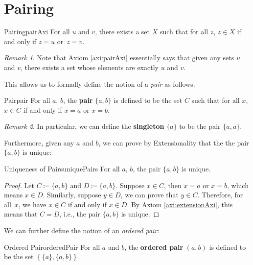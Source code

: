 \documentclass[math]{amznotes}
\theoremstyle{remark}
\newtheorem*{remark}{Remark}
\begin{document}
\section{Pairing}
\begin{axibox}{Pairing}{pairAxi}
    For all $u$ and $v$, there exists a set $X$ such that for all $z$, $z \in X$ if and only if $z = u$ or~$z = v$.
\end{axibox}
\begin{notebox}
    \begin{remark}
        Note that Axiom \ref{axi:pairAxi} essentially says that given any sets $u$ and $v$, there exists a set whose elements are exactly $u$ and $v$.
    \end{remark}
\end{notebox}
This allows us to formally define the notion of a \textit{pair} as follows:
\begin{dfnbox}{Pair}{pair}
    For all $a$, $b$, the {\color{red} \textbf{pair}} $\{a, b\}$ is defined to be the set $C$ such that for all $x$, $x \in C$ if and only if $x = a$ or $x = b$.
\end{dfnbox}
\begin{notebox}
    \begin{remark}
        In particular, we can define the {\color{red} \textbf{singleton}} $\{a\}$ to be the pair $\{a, a\}$.
    \end{remark}
\end{notebox}
Furthermore, given any $a$ and $b$, we can prove by Extensionality that the the pair $\{a, b\}$ is unique:
\begin{thmbox}{Uniqueness of Pairs}{uniquePairs}
    For all $a$, $b$, the pair $\{a, b\}$ is unique.
    \tcblower   
    \begin{proof}
        Let $C \coloneqq \{a, b\}$ and $D \coloneqq \{a, b\}$. Suppose $x \in C$, then $x = a$ or $x = b$, which means $x \in D$. Similarly, suppose $y \in D$, we can prove that $y \in C$. Therefore, for all~$x$, we have $x \in C$ if and only if $x \in D$. By Axiom \ref{axi:extensionAxi}, this means that $C = D$, i.e., the pair $\{a, b\}$ is unique.
    \end{proof}
\end{thmbox}
We can further define the notion of an \textit{ordered pair}:
\begin{dfnbox}{Ordered Pair}{orderedPair}
    For all $a$ and $b$, the {\color{red} \textbf{ordered pair}} $(a, b)$ is defined to be the set $\left\{\{a\}, \{a, b\}\right\}$.
\end{dfnbox}
\end{document}
